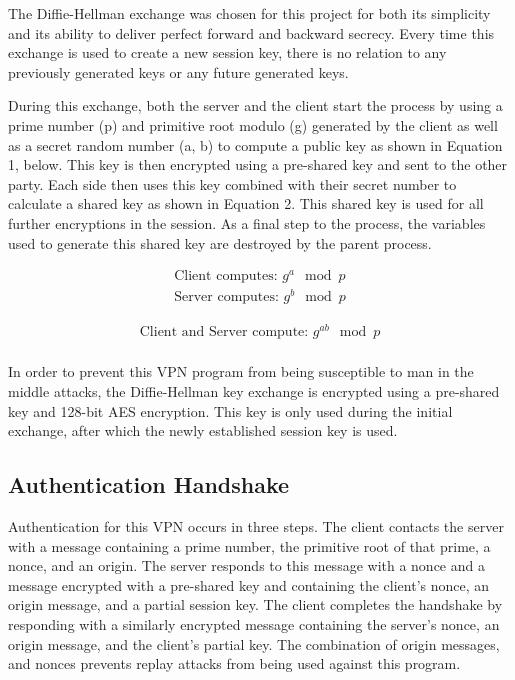 \documentclass[journal]{IEEEtran}
\begin{document}
The Diffie-Hellman exchange was chosen for this project for both its simplicity and its ability to deliver perfect forward and backward secrecy. Every time this exchange is used to create a new session key, there is no relation to any previously generated keys or any future generated keys.

During this exchange, both the server and the client start the process by using a prime number (p) and primitive root modulo (g) generated by the client as well as a secret random number (a, b) to compute a public key as shown in Equation 1, below. This key is then encrypted using a pre-shared key and sent to the other party. Each side then uses this key combined with their secret number to calculate a shared key as shown in Equation 2. This shared key is used for all further encryptions in the session. As a final step to the process, the variables used to generate this shared key are destroyed by the parent process.

\begin{gather}
\mbox{Client computes: }g^{a}\mod{p} \nonumber \\ 
\mbox{Server computes: }g^{b}\mod{p}
\end{gather}

\begin{gather}
\mbox{Client and Server compute: }g^{ab}\mod{p}\\
\nonumber
\end{gather}

In order to prevent this VPN program from being susceptible to man in the middle attacks, the Diffie-Hellman key exchange is encrypted using a pre-shared key and 128-bit AES encryption. This key is only used during the initial exchange, after which the newly established session key is used.

\subsection*{Authentication Handshake}
Authentication for this VPN occurs in three steps. The client contacts the server with a message containing a prime number, the primitive root of that prime, a nonce, and an origin. The server responds to this message with a nonce and a message encrypted with a pre-shared key and containing the client's nonce, an origin message, and a partial session key. The client completes the handshake by responding with a similarly encrypted message containing the server's nonce, an origin message, and the client's partial key. The combination of origin messages, and nonces prevents replay attacks from being used against this program. 
\end{document}
